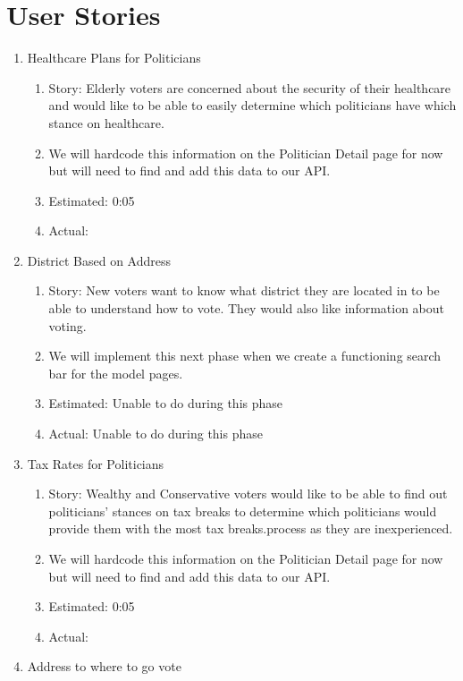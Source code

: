 \documentclass[11t]{article}
\begin{document}
\section{User Stories}
\begin{enumerate}
    \item Healthcare Plans for Politicians
    \begin{enumerate}
        \item Story: Elderly voters are concerned about the security of their healthcare and would like to be able to easily determine which politicians have which stance on healthcare.
        \item We will hardcode this information on the Politician Detail page for now but will need to find and add this data to our API. 
        \item Estimated: 0:05
        \item Actual:
    \end{enumerate}
    \item District Based on Address
    \begin{enumerate}
        \item Story: New voters want to know what district they are located in to be able to understand how to vote. They would also like information about voting. 
        \item We will implement this next phase when we create a functioning search bar for the model pages.
        \item Estimated: Unable to do during this phase
        \item Actual: Unable to do during this phase
    \end{enumerate}
    \item Tax Rates for Politicians
    \begin{enumerate}
        \item Story: Wealthy and Conservative voters would like to be able to find out politicians’ stances on tax breaks to determine which politicians would provide them with the most tax breaks.process as they are inexperienced.
        \item We will hardcode this information on the Politician Detail page for now but will need to find and add this data to our API. 
        \item Estimated: 0:05
        \item Actual:
    \end{enumerate}
    \item Address to where to go vote
    \begin{enumerate}

\end{enumerate}
\end{enumerate}
\end{document}
